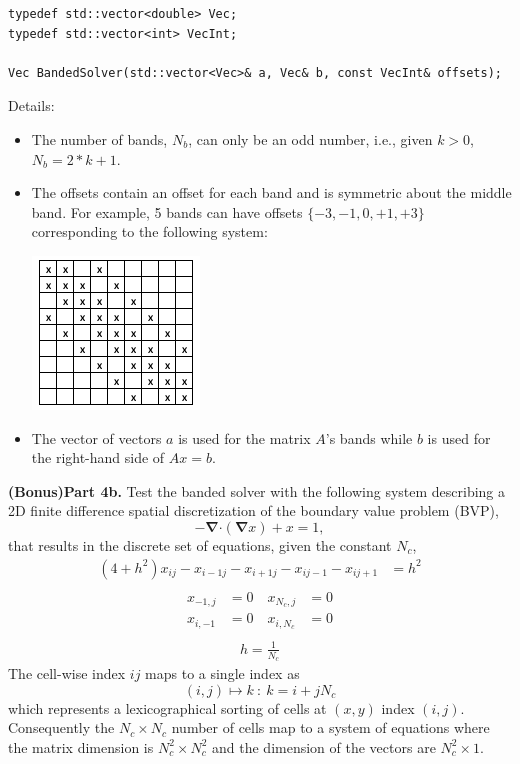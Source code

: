 \documentclass[10pt,letterpaper,notitlepage]{article}
\newcommand{\bnabla}{\boldsymbol{\nabla}}
\newcommand{\dotp}{\boldsymbol{\cdot}}
\newcommand{\beq}{\begin{equation*} \begin{aligned}}
\newcommand{\eeq}{\end{aligned}\end{equation*}}
\begin{document}
\begin{verbatim}
typedef std::vector<double> Vec;
typedef std::vector<int> VecInt;

Vec BandedSolver(std::vector<Vec>& a, Vec& b, const VecInt& offsets);
\end{verbatim}

Details:
\begin{itemize}
	\item The number of bands, $N_b$, can only be an odd number, i.e., given $k>0$, $N_b = 2*k + 1$.
	\item The offsets contain an offset for each band and is symmetric about the middle band. For example, 5 bands can have offsets $\{-3,-1,0,+1,+3\}$ corresponding to the following system:
	\begin{center}
		\includegraphics[width=0.2\linewidth]{matrix2D9x9}
	\end{center}
	\item The vector of vectors $a$ is used for the matrix $A$'s bands while $b$ is used for the right-hand side of $Ax=b$.
	
\end{itemize}

\vspace{1cm}
\noindent
\textbf{(Bonus)Part 4b.} Test the banded solver with the following system describing a 2D finite difference spatial discretization of the boundary value problem (BVP), 
$$
-\bnabla \dotp (\bnabla x) + x = 1,
$$
that results in the discrete set of equations, given the constant $N_c$,
\beq 
(4+h^2) x_{ij} 
- x_{i-1j} - x_{i+1j} - x_{ij-1} - x_{ij+1}
&= h^2 \\
\eeq 
\beq
x_{-1,j} &= 0 \quad x_{N_c,j} &= 0 \\
x_{i,-1} &= 0 \quad x_{i,N_c} &= 0 \\
\eeq
\beq 
h = \frac{1}{N_c}
\eeq 
The cell-wise index $ij$ maps to a single index as 
$$(i,j) \mapsto k \ : \ k = i + j N_c$$
which represents a lexicographical sorting of cells at $(x,y)$ index $(i,j)$. Consequently the $N_c{\times}N_c$ number of cells map to a system of equations where the matrix dimension is $N_c^2 {\times} N_c^2$ and the dimension of the vectors are $N_c^2{\times}1$.

%	
%	   

\end{document}
